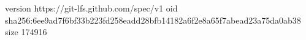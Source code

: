 version https://git-lfs.github.com/spec/v1
oid sha256:6ee9ad7f6bf33b223fd258eadd28bfb14182a6f2e8a65f7abead23a75da0ab38
size 174916
